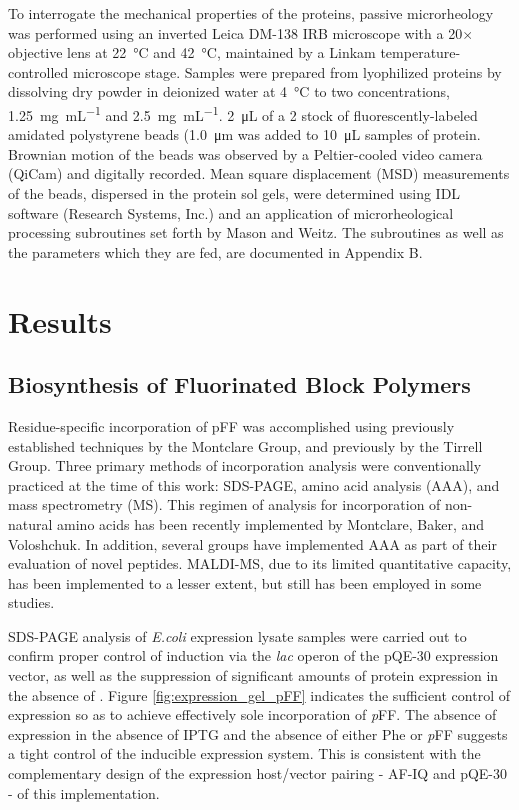 \begin{refsection}
To interrogate the mechanical properties of the proteins, passive microrheology
was performed using an inverted Leica DM-138 IRB microscope with a 20$\times$
objective lens at \SI{22}{\celsius} and \SI{42}{\celsius}, maintained by a
Linkam temperature-controlled microscope stage. Samples were prepared from
lyophilized proteins by dissolving dry powder in deionized water at
\SI{4}{\celsius} to two concentrations, \SI{1.25}{\mg\per\mL} and
\SI{2.5}{\mg\per\mL}. \SI{2}{\uL} of a \SI{2}{\wtper} stock of
fluorescently-labeled amidated polystyrene beads (\SI{1.0}{\um} was added to
\SI{10}{\uL} samples of protein. Brownian motion of the beads was observed by a
Peltier-cooled video camera (QiCam) and digitally recorded.  Mean square
displacement (MSD) measurements of the beads, dispersed in the protein sol gels,
were determined using IDL software (Research Systems, Inc.) and an application
of microrheological processing subroutines set forth by Mason and
Weitz.\cite{Mason1997} The subroutines as well as the parameters which they are
fed, are documented in Appendix B. 

\section{Results}

\subsection{Biosynthesis of Fluorinated Block Polymers}

Residue-specific incorporation of pFF was accomplished using previously
established techniques by the Montclare Group, and previously by the Tirrell
Group.\cite{Yoshikawa1994,Sharma2000,Voloshchuk2009} Three primary methods of
incorporation analysis were conventionally practiced at the time of this work:
SDS-PAGE, amino acid analysis (AAA), and mass spectrometry (MS). 
This regimen of analysis for incorporation of non-natural amino acids has been
recently implemented by Montclare, Baker, and
Voloshchuk\cite{Voloshchuk2009,Panchenko2006,Baker2011}. In
addition, several groups have implemented AAA as part of their evaluation of novel
peptides. MALDI-MS, due to its limited quantitative capacity, has been
implemented to a lesser extent, but still has been employed in some
studies.\cite{Taki2001}

SDS-PAGE analysis of \emph{E.coli} expression lysate samples were carried out to
confirm proper control of induction via the \emph{lac} operon of the pQE-30
expression vector, as well as the suppression of significant amounts of protein
expression in the absence of .  Figure
\ref{fig:expression_gel_pFF} indicates the sufficient control of expression so
as to achieve effectively sole incorporation of \emph{p}FF. The absence of
expression in the absence of IPTG and the absence of either Phe or \emph{p}FF
suggests a tight control of the inducible expression system. This is consistent
with the complementary design of the expression host/vector pairing - AF-IQ and
pQE-30 - of this implementation.


\end{refsection}
